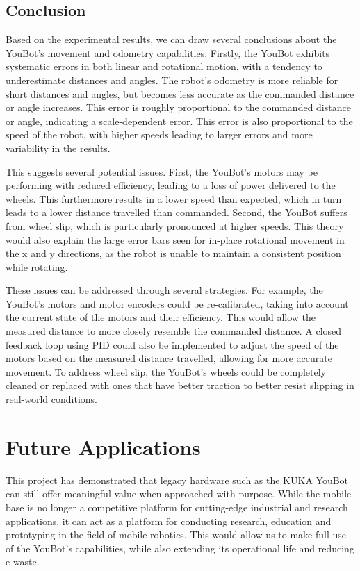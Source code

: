 \documentclass[a4paper, 12pt]{article}
\begin{document}
    
    \subsection{Conclusion}

    Based on the experimental results, we can draw several conclusions about the YouBot's movement and odometry capabilities. Firstly, the YouBot exhibits systematic errors in both linear and rotational motion, with a tendency to underestimate distances and angles. The robot's odometry is more reliable for short distances and angles, but becomes less accurate as the commanded distance or angle increases. This error is roughly proportional to the commanded distance or angle, indicating a scale-dependent error. This error is also proportional to the speed of the robot, with higher speeds leading to larger errors and more variability in the results.
    
    This suggests several potential issues. First, the YouBot's motors may be performing with reduced efficiency, leading to a loss of power delivered to the wheels. This furthermore results in a lower speed than expected, which in turn leads to a lower distance travelled than commanded. Second, the YouBot suffers from wheel slip, which is particularly pronounced at higher speeds. This theory would also explain the large error bars seen for in-place rotational movement in the x and y directions, as the robot is unable to maintain a consistent position while rotating.

    These issues can be addressed through several strategies. For example, the YouBot's motors and motor encoders could be re-calibrated, taking into account the current state of the motors and their efficiency. This would allow the measured distance to more closely resemble the commanded distance. A closed feedback loop using PID could also be implemented to adjust the speed of the motors based on the measured distance travelled, allowing for more accurate movement. To address wheel slip, the YouBot's wheels could be completely cleaned or replaced with ones that have better traction to better resist slipping in real-world conditions. 

    \pagebreak

    \section{Future Applications}

    This project has demonstrated that legacy hardware such as the KUKA YouBot can still offer meaningful value when approached with purpose. While the mobile base is no longer a competitive platform for cutting-edge industrial and research applications, it can act as a platform for conducting research, education and prototyping in the field of mobile robotics. This would allow us to make full use of the YouBot's capabilities, while also extending its operational life and reducing e-waste.
\end{document}
